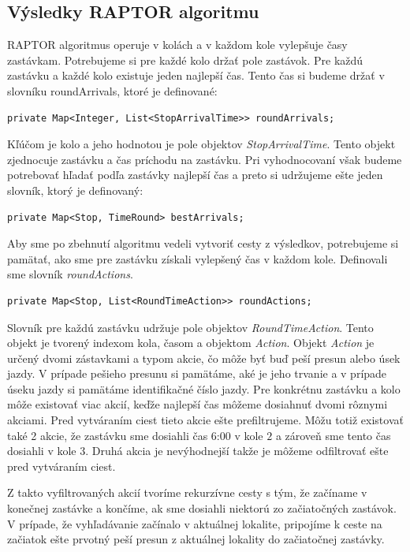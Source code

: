\subsection{Výsledky RAPTOR algoritmu}
RAPTOR algoritmus operuje v kolách a v každom kole vylepšuje časy zastávkam. Potrebujeme si pre každé kolo držať pole zastávok. Pre každú zastávku a každé kolo existuje jeden najlepší čas. Tento čas si budeme držať v slovníku roundArrivals, ktoré je definované:
\begin{lstlisting}
private Map<Integer, List<StopArrivalTime>> roundArrivals; 
\end{lstlisting}
Kľúčom je kolo a jeho hodnotou je pole objektov \textit{StopArrivalTime}. Tento objekt zjednocuje zastávku a čas príchodu na zastávku. Pri vyhodnocovaní však budeme potrebovať hľadať podľa zastávky najlepší čas a preto si udržujeme ešte jeden slovník, ktorý je definovaný:
\begin{lstlisting}
private Map<Stop, TimeRound> bestArrivals;
\end{lstlisting}
Aby sme po zbehnutí algoritmu vedeli vytvoriť cesty z výsledkov, potrebujeme si pamätať, ako sme pre zastávku získali  vylepšený čas v každom kole. Definovali sme slovník \textit{roundActions}.
\begin{lstlisting}
private Map<Stop, List<RoundTimeAction>> roundActions;
\end{lstlisting}
Slovník pre každú zastávku udržuje pole objektov \textit{RoundTimeAction}. Tento objekt je tvorený indexom kola, časom a objektom \textit{Action}. Objekt \textit{Action} je určený dvomi zástavkami a typom akcie, čo môže byť buď peší presun alebo úsek jazdy. V prípade pešieho presunu si pamätáme, aké je jeho trvanie a v prípade úseku jazdy si pamätáme identifikačné číslo jazdy. Pre konkrétnu zastávku a kolo môže existovať viac akcií, keďže najlepší čas môžeme dosiahnuť dvomi rôznymi akciami. Pred vytváraním ciest tieto akcie ešte prefiltrujeme. Môžu totiž existovať také 2 akcie, že zastávku sme dosiahli čas 6:00 v kole $2$ a zároveň sme tento čas dosiahli v kole $3$. Druhá akcia je nevýhodnejší takže je môžeme odfiltrovať ešte pred vytváraním ciest.

Z takto vyfiltrovaných akcií tvoríme rekurzívne cesty s tým, že začíname v konečnej zastávke  a končíme, ak sme dosiahli niektorú zo začiatočných zastávok. V prípade, že vyhľadávanie začínalo v aktuálnej lokalite, pripojíme k ceste na začiatok ešte prvotný peší presun z aktuálnej lokality do začiatočnej zastávky.

